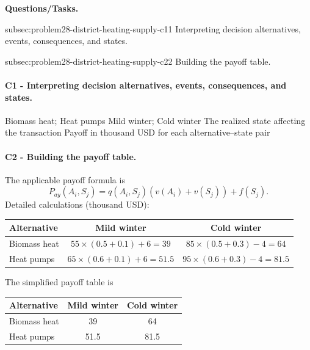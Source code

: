 	\textbf{Questions/Tasks.}
	\begin{enumerate}
	\CriterionTask
	{subsec:problem28-district-heating-supply-c1}{1}
	{Interpreting decision alternatives, events, consequences, and states.}

	\CriterionTask
	{subsec:problem28-district-heating-supply-c2}{2}
	{Building the payoff table.}
	\end{enumerate}

	\paragraph*{C1 - Interpreting decision alternatives, events, consequences, and states.}
	\label{subsec:problem28-district-heating-supply-c1}
	\DecisionElementsTable
	{Biomass heat; Heat pumps}
	{Mild winter; Cold winter}
	{The realized state affecting the transaction}
	{Payoff in thousand USD for each alternative--state pair}

	\paragraph*{C2 - Building the payoff table.}
	\label{subsec:problem28-district-heating-supply-c2}
	The applicable payoff formula is
	\[ P_{ay}(A_i,S_j)=q(A_i,S_j)\left(v(A_i)+v(S_j)\right)+f(S_j). \]
	Detailed calculations (thousand USD):
	\begin{center}\small
	\begin{tabular}{lcc}
	\toprule
	Alternative & Mild winter & Cold winter \\
	\midrule
	Biomass heat & $55\times(0.5+0.1)+6=39$ & $85\times(0.5+0.3)-4=64$ \\
Heat pumps & $65\times(0.6+0.1)+6=51.5$ & $95\times(0.6+0.3)-4=81.5$ \\
	\bottomrule
	\end{tabular}
	\end{center}
	The simplified payoff table is
	\begin{center}
	\begin{tabular}{lcc}
	\toprule
	Alternative & Mild winter & Cold winter \\
	\midrule
	Biomass heat & 39 & 64 \\
Heat pumps & 51.5 & 81.5 \\
	\bottomrule
	\end{tabular}
	\end{center}

